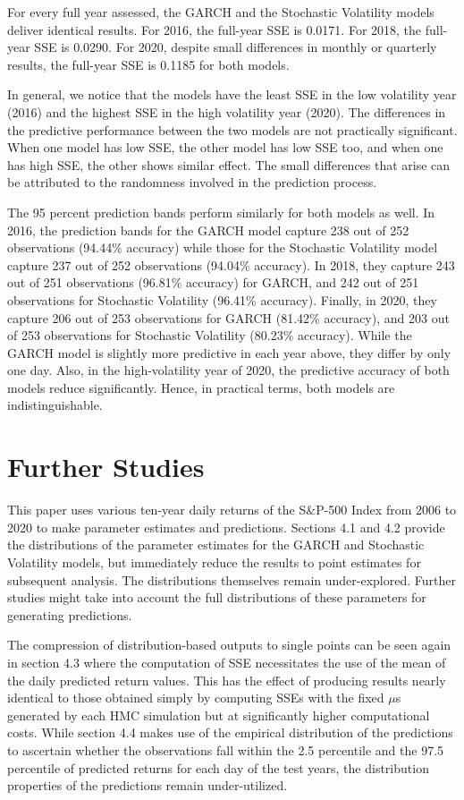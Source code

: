 \documentclass[12pt,letterpaper,reqno,fleqn]{article}
\begin{document}
For every full year assessed, the GARCH and the Stochastic Volatility models deliver identical results. For 2016, the full-year SSE is 0.0171. For 2018, the full-year SSE is 0.0290. For 2020, despite small differences in monthly or quarterly results, the full-year SSE is 0.1185 for both models. 

In general, we notice that the models have the least SSE in the low volatility year (2016) and the highest SSE in the high volatility year (2020).
The differences in the predictive performance between the two models are not practically significant. When one model has low SSE, the other model has low SSE too, and when one has high SSE, the other shows similar effect. The small differences that arise can be attributed to the randomness involved in the prediction process. 

The 95 percent prediction bands perform similarly for both models as well. In 2016, the prediction bands for the GARCH model capture 238 out of 252 observations (94.44\% accuracy) while those for the Stochastic Volatility model capture 237 out of 252 observations (94.04\% accuracy). In 2018, they capture 243 out of 251 observations (96.81\% accuracy) for GARCH, and 242 out of 251 observations for Stochastic Volatility (96.41\% accuracy). Finally, in 2020, they capture 206 out of 253 observations for GARCH (81.42\% accuracy), and 203 out of 253 observations for Stochastic Volatility (80.23\% accuracy). While the GARCH model is slightly more predictive in each year above, they differ by only one day. Also, in the high-volatility year of 2020, the predictive accuracy of both models reduce significantly. Hence, in practical terms, both models are indistinguishable. 


\newpage
\section{Further Studies}
This paper uses various ten-year daily returns of the S\&P-500 Index from 2006 to 2020 to make parameter estimates and predictions. Sections 4.1 and 4.2 provide the distributions of the parameter estimates for the GARCH and Stochastic Volatility models, but immediately reduce the results to point estimates for subsequent analysis. The distributions themselves remain under-explored. Further studies might take into account the full distributions of these parameters for generating predictions. 

The compression of distribution-based outputs to single points can be seen again in section 4.3 where the computation of SSE necessitates the use of the mean of the daily predicted return values. This has the effect of producing results nearly identical to those obtained simply by computing SSEs with the fixed $\mu$s generated by each HMC simulation but at significantly higher computational costs. While section 4.4 makes use of the empirical distribution of the predictions to ascertain whether the observations fall within the 2.5 percentile and the 97.5 percentile of predicted returns for each day of the test years, the distribution properties of the predictions remain under-utilized. 
\end{document}
